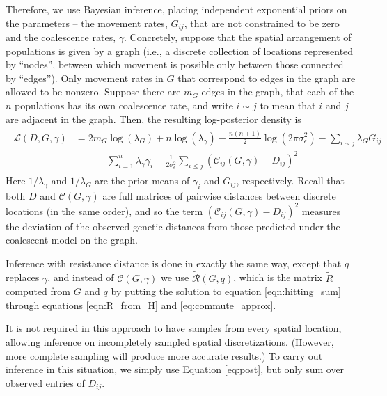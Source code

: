 \documentclass{article}
\newcommand{\comdist}{\widetilde{R}}
\newcommand{\comdistfn}{\widetilde{\mathcal{R}}}
\begin{document}
Therefore, we use Bayesian inference,
placing independent exponential priors on the parameters --
the movement rates, $G_{ij}$, that are not constrained to be zero
and the coalescence rates, $\gamma$.
Concretely, suppose that the spatial arrangement of populations is given by a graph 
(i.e., a discrete collection of locations represented by ``nodes'',
between which movement is possible only between those connected by ``edges''). 
Only movement rates in $G$ that correspond to edges in the graph are allowed to be nonzero.
Suppose there are $m_G$ edges in the graph,
that each of the $n$ populations has its own coalescence rate,
and write $i \sim j$ to mean that $i$ and $j$ are adjacent in the graph.
Then, the resulting log-posterior density is
\begin{align} \label{eq:post}
    \begin{split}
\mathcal{L}(D, G, \gamma) 
    &=
    2 m_G \log(\lambda_G) + n \log(\lambda_\gamma) 
    - \frac{n(n+1)}{2} \log(2 \pi \sigma^2_\epsilon)
	- \sum_{i \sim j} \lambda_G G_{ij}  \\
    &\qquad
    -\sum_{i=1}^n \lambda_{\gamma}\gamma_i
		-\frac{1}{2 \sigma_{\epsilon}^2} \sum_{i \leq j} \left(
            \mathcal{C}_{ij}(G,\gamma) - D_{ij}
        \right)^2 
    \end{split}
\end{align}
Here $1/\lambda_\gamma$ and $1/\lambda_G$ are the prior means of $\gamma_i$ and $G_{ij}$,
respectively.
Recall that both $D$ and $\mathcal{C}(G,\gamma)$ are full matrices of pairwise distances between discrete locations (in the same order), 
and so the term $(\mathcal{C}_{ij}(G,\gamma) - D_{ij})^2$
measures the deviation of the observed genetic distances
from those predicted under the coalescent model on the graph. 


Inference with resistance distance is done in exactly the same way,
except that $q$ replaces $\gamma$,
and instead of $\mathcal{C}(G,\gamma)$ we use $\comdistfn(G, q)$,
which is the matrix $\comdist$ computed from $G$ and $q$ 
by putting the solution to equation \eqref{eqn:hitting_sum}
through equations \eqref{eqn:R_from_H} and \eqref{eq:commute_approx}.

It is not required in this approach to have samples from every spatial location,
allowing inference on incompletely sampled spatial discretizations.
(However, more complete sampling will produce more accurate results.) 
To carry out inference in this situation,
we simply use Equation \ref{eq:post},
but only sum over observed entries of $D_{ij}$.
\end{document}
